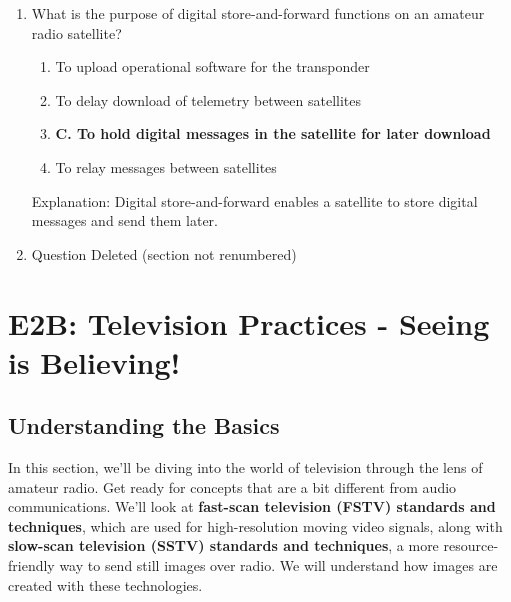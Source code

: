 \begin{enumerate}
       \item What is the purpose of digital store-and-forward functions on an amateur radio satellite?
    \begin{enumerate}
     \item  To upload operational software for the transponder
     \item  To delay download of telemetry between satellites
      \item \textbf{C. To hold digital messages in the satellite for later download}
        \item  To relay messages between satellites
      \end{enumerate}
    \textcolor{myred}{Explanation:}
        Digital store-and-forward enables a satellite to store digital messages and send them later.
 
 \item Question Deleted (section not renumbered)
\end{enumerate}

\section{E2B: Television Practices - Seeing is Believing!}

\subsection*{Understanding the Basics}
In this section, we'll be diving into the world of television through the lens of amateur radio. Get ready for concepts that are a bit different from audio communications.
We'll look at \textcolor{myblue}{\textbf{fast-scan television (FSTV) standards and techniques}}, which are used for high-resolution moving video signals, along with \textcolor{myblue}{\textbf{slow-scan television (SSTV) standards and techniques}}, a more resource-friendly way to send still images over radio. We will understand how images are created with these technologies.


